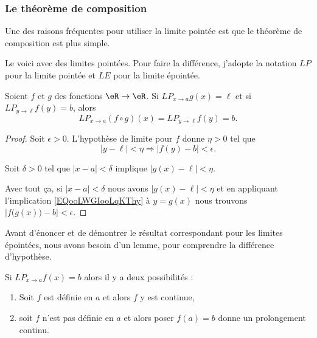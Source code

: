 \subsubsection{Le théorème de composition}

Une des raisons fréquentes pour utiliser la limite pointée est que le théorème de composition est plus simple\cite{BIBooDILKooUcmUVD}.

Le voici avec des limites pointées. Pour faire la différence, j'adopte la notation \( {LP}\) pour la limite pointée et \( {LE}\) pour la limite épointée.
\begin{proposition}     \label{PROPooCQZZooMiZfQE}
    Soient \( f\) et \( g\) des fonctions \( \eR\to \eR\). Si \( {LP}_{x\to a}g(x)=\ell\) et si \( {LP}_{y\to \ell}f(y)=b\), alors
    \begin{equation}
        {LP}_{x\to a} (f\circ g)(x)={LP}_{y\to \ell} f(y)=b.
    \end{equation}
\end{proposition}

\begin{proof}
    Soit \( \epsilon>0\). L'hypothèse de limite pour \( f\) donne \( \eta>0\) tel que 
    \begin{equation}        \label{EQooLWGIooLqKThy}
        | y-\ell |<\eta \Rightarrow | f(y)-b |<\epsilon.
    \end{equation}

    Soit \( \delta>0\) tel que \( | x-a |<\delta\) implique \( | g(x)-\ell |<\eta\).

    Avec tout ça, si \( | x-a |<\delta\) nous avons \( | g(x)-\ell |<\eta\) et en appliquant l'implication \eqref{EQooLWGIooLqKThy} à \( y=g(x)\) nous trouvons \( | f\big( g(x) \big)-b |<\epsilon\).
\end{proof}

Avant d'énoncer et de démontrer le résultat correspondant pour les limites épointées, nous avons besoin d'un lemme, pour comprendre la différence d'hypothèse.

\begin{lemma}
    Si \( {LP}_{x\to a}f(x)=b\) alors il y a deux possibilités : 
    \begin{enumerate}
        \item
            Soit \( f\) est définie en \( a\) et alors \( f\) y est continue,
        \item 
            soit \( f\) n'est pas définie en \( a\) et alors poser \( f(a)=b\) donne un prolongement continu.
    \end{enumerate}
\end{lemma}

